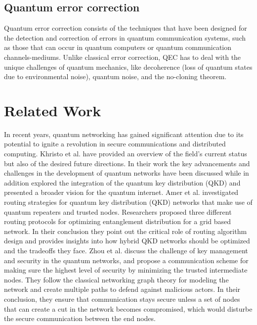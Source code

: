 \documentclass[12pt]{ieeetj}
\begin{document}
		\subsection{Quantum error correction}

		Quantum error correction consists of the techniques that have been designed for the
		detection and correction of errors in quantum communication systems, such as those that can occur 
		in quantum computers or quantum communication channels-mediums.
		Unlike classical error correction, QEC has to deal with the unique challenges of quantum mechanics,
		like decoherence (loss of quantum states due to environmental noise), quantum noise, 
		and the no-cloning theorem.
		



\section{Related Work}
		In recent years, quantum networking has gained
		significant attention due to its potential to ignite a revolution in
		secure communications and distributed computing.
		Khristo et al. \cite{Khristo2020} have provided an overview of the field's
		current status but also of the desired future directions.
		In their work the key advancements and challenges in the
		development of quantum networks have been discussed while in addition
		explored the integration of the quantum key distribution (QKD)
		and presented a broader vision for the quantum internet.
		Amer et al.\cite{amer-routing} investigated routing strategies for quantum key distribution (QKD) networks 
		that make use of quantum repeaters and trusted nodes. 
		Researchers proposed three different routing protocols for optimizing entanglement distribution 
		for a grid based network. In their conclusion they point out the critical role of routing algorithm design 
		and provides insights into how hybrid QKD networks should be optimized and the tradeoffs they face. 
		Zhou et al.\cite{qkd-zhou} discuss the challenge of key management and security in the quantum networks, 
		and propose a communication scheme for making sure the highest level of security by minimizing the trusted intermediate nodes.
		They follow the classical networking graph theory for modeling the network and create multiple paths to defend against malicious actors.
		In their conclusion, they ensure that communication stays secure unless a set of nodes that can create a cut in the network
		becomes compromised, which would disturbe the secure communication between the end nodes.
\end{document}
